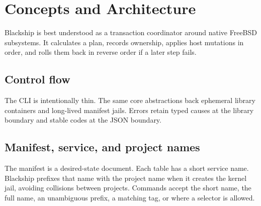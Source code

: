 \chapter{Concepts and Architecture}
\label{ch:architecture}

Blackship is best understood as a transaction coordinator around native
FreeBSD subsystems. It calculates a plan, records ownership, applies host
mutations in order, and rolls them back in reverse order if a later step fails.

\section{Control flow}

\begin{shipfigure}
\end{shipfigure}

The CLI is intentionally thin. The same core abstractions back ephemeral
library containers and long-lived manifest jails. Errors retain typed causes at
the library boundary and stable codes at the JSON boundary.

\section{Manifest, service, and project names}

The manifest is a desired-state document. Each \setting{[[jails]]} table has a
short service name. Blackship prefixes that name with the project name when it
creates the kernel jail, avoiding collisions between projects. Commands accept
the short name, the full name, an unambiguous prefix, a matching tag, or
 where a selector is allowed.

